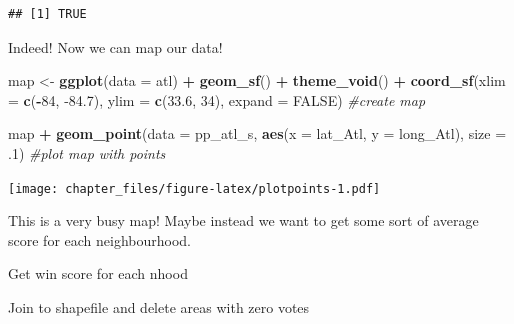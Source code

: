 \documentclass[
]{article}
\newenvironment{Shaded}{\begin{snugshade}}{\end{snugshade}}
\newcommand{\CommentTok}[1]{\textcolor[rgb]{0.56,0.35,0.01}{\textit{#1}}}
\newcommand{\DataTypeTok}[1]{\textcolor[rgb]{0.13,0.29,0.53}{#1}}
\newcommand{\DecValTok}[1]{\textcolor[rgb]{0.00,0.00,0.81}{#1}}
\newcommand{\FloatTok}[1]{\textcolor[rgb]{0.00,0.00,0.81}{#1}}
\newcommand{\KeywordTok}[1]{\textcolor[rgb]{0.13,0.29,0.53}{\textbf{#1}}}
\newcommand{\NormalTok}[1]{#1}
\newcommand{\OperatorTok}[1]{\textcolor[rgb]{0.81,0.36,0.00}{\textbf{#1}}}
\newcommand{\OtherTok}[1]{\textcolor[rgb]{0.56,0.35,0.01}{#1}}
\newcommand{\StringTok}[1]{\textcolor[rgb]{0.31,0.60,0.02}{#1}}
\begin{document}
\begin{verbatim}
## [1] TRUE
\end{verbatim}

Indeed! Now we can map our data!

\begin{Shaded}
\begin{Highlighting}[]
\NormalTok{map <-}\StringTok{ }\KeywordTok{ggplot}\NormalTok{(}\DataTypeTok{data =}\NormalTok{ atl) }\OperatorTok{+}\StringTok{ }\KeywordTok{geom_sf}\NormalTok{() }\OperatorTok{+}\StringTok{ }\KeywordTok{theme_void}\NormalTok{() }\OperatorTok{+}
\StringTok{  }\KeywordTok{coord_sf}\NormalTok{(}\DataTypeTok{xlim =} \KeywordTok{c}\NormalTok{(}\OperatorTok{-}\DecValTok{84}\NormalTok{, }\FloatTok{-84.7}\NormalTok{), }\DataTypeTok{ylim =} \KeywordTok{c}\NormalTok{(}\FloatTok{33.6}\NormalTok{, }\DecValTok{34}\NormalTok{), }\DataTypeTok{expand =} \OtherTok{FALSE}\NormalTok{) }\CommentTok{#create map}
  
\NormalTok{map }\OperatorTok{+}\StringTok{ }\KeywordTok{geom_point}\NormalTok{(}\DataTypeTok{data =}\NormalTok{ pp_atl_s, }\KeywordTok{aes}\NormalTok{(}\DataTypeTok{x =}\NormalTok{ lat_Atl, }\DataTypeTok{y =}\NormalTok{ long_Atl), }\DataTypeTok{size =} \FloatTok{.1}\NormalTok{) }\CommentTok{#plot map with points}
\end{Highlighting}
\end{Shaded}

\texttt{[image: chapter\_files/figure-latex/plotpoints-1.pdf]}

This is a very busy map! Maybe instead we want to get some sort of
average score for each neighbourhood.

Get win score for each nhood

\begin{Shaded}
\end{Shaded}

Join to shapefile and delete areas with zero votes
\end{document}

